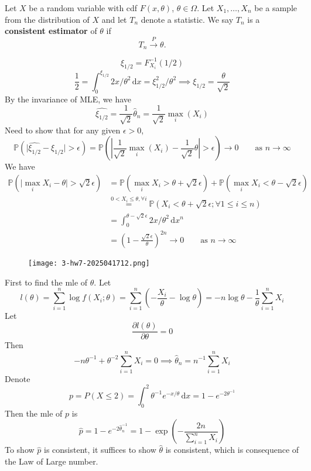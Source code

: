\begin{definition}[Consistency]
Let $X$ be a random variable with cdf $F(x, \theta)$, $\theta \in \Omega$. Let $X_1, \ldots, X_n$ be a sample from the distribution of $X$ and let $T_n$ denote a statistic. We say $T_n$ is a \textbf{consistent estimator} of $\theta$ if
\[
T_n \xrightarrow{P} \theta .
\]
\end{definition}
\[
\xi_{1/2 }=F_{X_i}^{-1}(1/2 )
\]
\[
\frac{1}{2}=\int_{0}^{\xi_{1/2 }} 2x/\theta^{2} \, \mathrm{d}x=\xi_{1/2 }^2/\theta^{2}\implies \xi_{1/2 }=\frac{\theta}{\sqrt{ 2 }}
\]
By the invariance of MLE, we have
\[
\widehat{\xi_{1/2 }}=\frac{1}{\sqrt{ 2 }}\widehat{\theta}_n=\frac{1}{\sqrt{ 2 }}\max_i(X_i)
\]
Need to show that for any given $\epsilon>0$,
\[
\mathbb{P}(\lvert \widehat{\xi_{1/2 }}-\xi_{1/2 } \rvert >\epsilon)=\mathbb{P}\left(\left\lvert   \frac{1}{\sqrt{ 2 }}\max_i(X_i)-\frac{1}{\sqrt{ 2 }}\theta  \right\rvert  >\epsilon\right)\to0\qquad \text{as }n\to \infty
\]
We have
\[
\begin{aligned}
\mathbb{P}(\lvert \max_iX_i-\theta \rvert >\sqrt{ 2 }\epsilon) & =\mathbb{P}(\max_iX_i>\theta+\sqrt{ 2 }\epsilon)+\mathbb{P}(\max_iX_i<\theta-\sqrt{ 2 }\epsilon) \\
 & \overset{ 0<X_i\leq \theta,\forall i }{ = }\mathbb{P}(X_i< \theta+\sqrt{ 2 }\epsilon;\forall 1\leq i\leq n) \\
 & =\int_{0}^{\theta-\sqrt{ 2 }\epsilon} 2x/\theta^{2} \, \mathrm{d}x  ^{n} \\
 & =\left( 1-\frac{\sqrt{ 2 }\epsilon}{\theta} \right)^{2n}\longrightarrow0\qquad \text{as }n\to \infty
\end{aligned}
\]
\begin{exercise}
\begin{figure}[H]
\centering
\texttt{[image: 3-hw7-2025041712.png]}
\label{}
\end{figure}
\end{exercise}
First to find the mle of $\theta$. Let
\[
l(\theta)=\sum_{i=1}^{n} \log f(X_i;\theta)=\sum_{i=1}^{n} \left( -\frac{X_i}{\theta}-\log\theta \right)=-n\log\theta-\frac{1}{\theta}\sum_{i=1}^{n} X_i
\]
Let
\[
\frac{ \partial l(\theta) }{ \partial \theta } =0
\]
Then
\[
-n\theta ^{-1}+\theta^{-2}\sum_{i=1}^{n} X_i=0\implies\widehat{\theta}_n=n^{-1}\sum_{i=1}^{n} X_i
\]
Denote
\[
p=P(X\leq2)=\int_{0}^{2} \theta ^{-1}e^{ -x/\theta } \, \mathrm{d}x =1-e^{ -2\theta ^{-1} }
\]
Then the mle of $p$ is
\[
\widehat{p}=1-e^{ -2\widehat{\theta}_n^{-1} }=1-\exp\left( - \frac{2n}{\sum_{i=1}^{n} X_i} \right)
\]
To show $\widehat{p}$ is consistent, it suffices to show $\widehat{\theta}$ is consistent, which is consequence of the Law of Large number.

